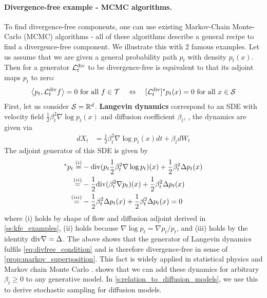 \documentclass{fairmeta}
\newcommand{\highlight}[1]{{\color{metablue} \textbf{#1}}}
\numberwithin{equation}{section}
\begin{document}
\paragraph{Divergence-free example - MCMC algorithms.}To find divergence-free components, one can use existing Markov-Chain Monte-Carlo (MCMC) algorithms - all of these algorithms describe a general recipe to find a divergence-free component. We illustrate this with 2 famous examples. Let us assume that we are given a general probability path $p_t$ with density $p_t(x)$. Then for a generator $\mathcal{L}_t^{\mathrm{div}}$  to be divergence-free is equivalent to that its adjoint maps $p_t$ to zero:
\begin{align}
\label{eq:divfree_condition}
\left \langle p_t, \mathcal{L}_t^{\mathrm{div}}f\right \rangle=0\text{ for all }f\in{\mathcal{T}} \quad \Leftrightarrow \quad [\mathcal{L}_t^{\mathrm{div}}]^*p_t(x)=0\text{ for all }x\in {\mathcal{S}}
\end{align}
First, let us consider ${\mathcal{S}}=\mathbb{R}^d$. \highlight{Langevin dynamics} correspond to an SDE with velocity field $\frac{1}{2}\beta_t^2\nabla\log p_t(x)$ and diffusion coefficient $\beta_t$, \ie, the dynamics are given via
\begin{align}
\label{eq:langevin_generator}
dX_t &=\frac{1}{2}\beta_t^2\nabla\log p_t(x)dt + \beta_t dW_t
\end{align}
The adjoint generator of this SDE is given by 
\begin{align*}
[\mathcal{L}_t^{\divv}]^*p_t \overset{(i)}{=}& -\divv(p_t\frac{1}{2}\beta_t^2\nabla\log p_t)(x)+\frac{1}{2}\beta_t^2\Delta p_t(x)\\
    \overset{(ii)}{=}&-\frac{1}{2}\divv(\beta_t^2\nabla p_t)(x)+\frac{1}{2}\beta_t^2\Delta p_t(x)\\
    \overset{(iii)}{=}&-\frac{1}{2}\beta_t^2\Delta p_t(x)+\frac{1}{2}\beta_t^2\Delta p_t(x)=0
\end{align*}
where (i) holds by shape of flow and diffusion adjoint derived in \cref{ss:kfe_examples}, (ii) holds because $\nabla \log p_t = \nabla p_t/p_t$, and (iii) holds by the identity $\mathrm{div}\nabla =\Delta$. The above shows that the generator of Langevin dynamics fulfils \cref{eq:divfree_condition} and is therefore divergence-free in sense of \cref{prop:markov_superposition}. This fact is widely applied in statistical physics and Markov chain Monte Carlo  \citep{roberts1996exponential}.  shows that we can add these dynamics for arbitrary $\beta_t\geq 0$ to any generative model. In \cref{s:relation_to_diffusion_models}, we use this to derive stochastic sampling for diffusion models. 
\end{document}
